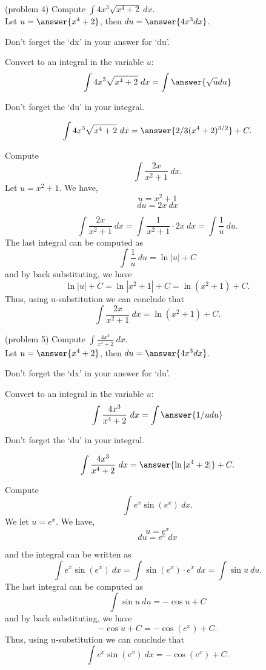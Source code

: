 \documentclass[handout]{ximera}
\begin{document}
\begin{problem}(problem 4) 
Compute $\displaystyle{\int 4x^3 \sqrt{x^4 +2} \ dx}$.\\
Let $u = \answer{x^4 + 2}$, then $du = \answer{4x^3 dx}$.\\
\begin{hint}
Don't forget the `dx' in your answer for `du'.
\end{hint}
Convert to an integral in the variable $u$:
\[\int 4x^3 \sqrt{x^4 +2} \ dx = \int\answer{\sqrt u du}\]
\begin{hint}
Don't forget the `du' in your integral.
\end{hint}

\[\int 4x^3 \sqrt{x^4 +2} \ dx = \answer{2/3(x^4 +2)^{3/2}} +C.\]
\end{problem}



\begin{example}[example 5] 
Compute 
\[\int \frac{2x}{x^2 + 1} \ dx.\]
Let $u = x^2 + 1$.  We have,
\[u = x^2 + 1\]
\[du = 2x \ dx\]

\[\int \frac{2x}{x^2 + 1} \ dx = \int \frac{1}{x^2 + 1} \cdot 2x\  dx = \int \frac{1}{u} \ du.\]
The last integral can be computed as 
\[\int \frac{1}{u} \ du = \ln|u| + C\]
and by back substituting, we have 
\[\ln|u| + C =  \ln|x^2 + 1| + C=\ln(x^2 + 1) + C.\]
Thus, using u-substitution we can conclude that
\[\int \frac{2x}{x^2 + 1} \ dx =  \ln(x^2 + 1) + C.\]
\end{example}



\begin{problem} (problem 5) 
Compute $\displaystyle{\int \frac{4x^3}{x^4 +2} \ dx}$.\\
Let $u = \answer{x^4 + 2}$, then $du = \answer{4x^3 dx}$.\\
\begin{hint}
Don't forget the `dx' in your answer for `du'.
\end{hint}
Convert to an integral in the variable $u$:
\[\int \frac{4x^3}{x^4 +2} \ dx = \int\answer{1/u du}\]
\begin{hint}
Don't forget the `du' in your integral.
\end{hint}

\[\int \frac{4x^3}{x^4 +2} \ dx = \answer{\ln|x^4 +2|} +C.\]
\end{problem}



\begin{example}[example 6] Compute 
\[\int e^x\sin(e^x) \ dx.\]
We let $u = e^x$.  We have,
\[u = e^x\]
\[du = e^x \ dx\]

and the integral can be written as 
\[\int e^x\sin(e^x) \ dx = \int \sin(e^x) \cdot e^x \  dx = \int \sin u \ du.\]
The last integral can be computed as 
\[\int \sin u \ du = -\cos u + C\]
and by back substituting, we have 
\[-\cos u + C = -\cos(e^x) + C.\]
Thus, using u-substitution we can conclude that
\[\int e^x\sin(e^x) \ dx =  -\cos(e^x) + C.\]
\end{example}
\end{document}
